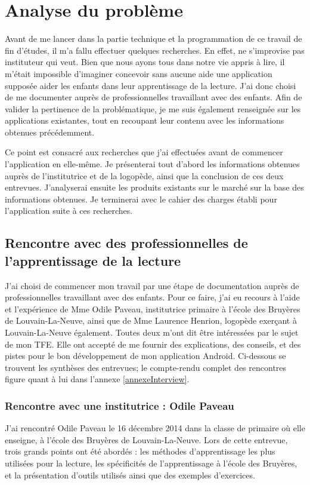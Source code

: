 \section{Analyse du problème}
Avant de me lancer dans la partie technique et la programmation de ce travail de fin d'études, il m'a fallu effectuer quelques recherches. En effet, ne s'improvise pas instituteur qui veut. Bien que nous ayons tous dans notre vie appris à lire, il m'était impossible d'imaginer concevoir sans aucune aide une application supposée aider les enfants dans leur apprentissage de la lecture. J'ai donc choisi de me documenter auprès de professionnelles travaillant avec des enfants. Afin de valider la pertinence de la problématique, je me suis également renseignée sur les applications existantes, tout en recoupant leur contenu avec les informations obtenues précédemment.

Ce point est consacré aux recherches que j'ai effectuées avant de commencer l'application en elle-même. Je présenterai tout d'abord les informations obtenues auprès de l'institutrice et de la logopède, ainsi que la conclusion de ces deux entrevues. J'analyserai ensuite les produits existants sur le marché sur la base des informations obtenues. Je terminerai avec le cahier des charges établi pour l'application suite à ces recherches.

\subsection{Rencontre avec des professionnelles de l'apprentissage de la lecture}
J'ai choisi de commencer mon travail par une étape de documentation auprès de professionnelles travaillant avec des enfants. Pour ce faire, j'ai eu recours à l'aide et l'expérience de Mme Odile Paveau, institutrice primaire à l'école des Bruyères de Louvain-La-Neuve, ainsi que de Mme Laurence Henrion, logopède exerçant à Louvain-La-Neuve également. Toutes deux m'ont dit être intéressées par le sujet de mon TFE. Elle ont accepté de me fournir des explications, des conseils, et des pistes pour le bon développement de mon application Android. Ci-dessous se trouvent les synthèses des entrevues; le compte-rendu complet des rencontres figure quant à lui dans l'annexe \ref{annexeInterview}.

\subsubsection{Rencontre avec une institutrice : Odile Paveau\label{Freinet}}
J'ai rencontré Odile Paveau le 16 décembre 2014 dans la classe de primaire où elle enseigne, à l'école des Bruyères de Louvain-La-Neuve. Lors de cette entrevue, trois grands points ont été abordés : les méthodes d'apprentissage les plus utilisées pour la lecture, les spécificités de l'apprentissage à l'école des Bruyères, et la présentation d'outils utilisés ainsi que des exemples d'exercices.\\

